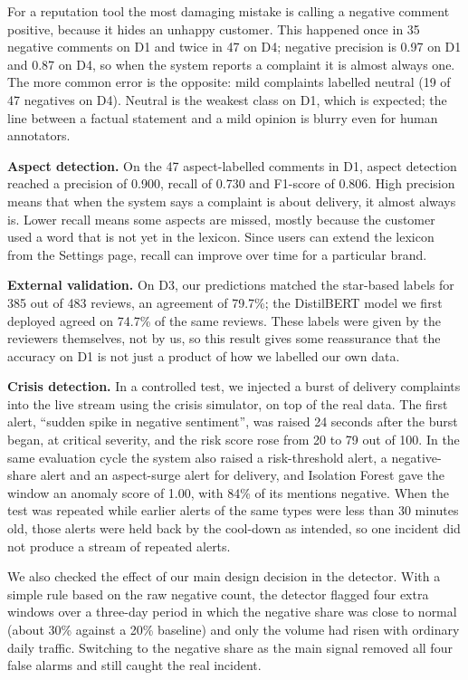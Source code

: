 \documentclass[12pt,a4paper]{report}
\begin{document}
For a reputation tool the most damaging mistake is calling a negative comment positive, because it hides an unhappy customer. This happened once in 35 negative comments on D1 and twice in 47 on D4; negative precision is 0.97 on D1 and 0.87 on D4, so when the system reports a complaint it is almost always one. The more common error is the opposite: mild complaints labelled neutral (19 of 47 negatives on D4). Neutral is the weakest class on D1, which is expected; the line between a factual statement and a mild opinion is blurry even for human annotators.

\textbf{Aspect detection.} On the 47 aspect-labelled comments in D1, aspect detection reached a precision of 0.900, recall of 0.730 and F1-score of 0.806. High precision means that when the system says a complaint is about delivery, it almost always is. Lower recall means some aspects are missed, mostly because the customer used a word that is not yet in the lexicon. Since users can extend the lexicon from the Settings page, recall can improve over time for a particular brand.

\textbf{External validation.} On D3, our predictions matched the star-based labels for 385 out of 483 reviews, an agreement of 79.7\%; the DistilBERT model we first deployed agreed on 74.7\% of the same reviews. These labels were given by the reviewers themselves, not by us, so this result gives some reassurance that the accuracy on D1 is not just a product of how we labelled our own data.

\textbf{Crisis detection.} In a controlled test, we injected a burst of delivery complaints into the live stream using the crisis simulator, on top of the real data. The first alert, ``sudden spike in negative sentiment'', was raised 24 seconds after the burst began, at critical severity, and the risk score rose from 20 to 79 out of 100. In the same evaluation cycle the system also raised a risk-threshold alert, a negative-share alert and an aspect-surge alert for delivery, and Isolation Forest gave the window an anomaly score of 1.00, with 84\% of its mentions negative. When the test was repeated while earlier alerts of the same types were less than 30 minutes old, those alerts were held back by the cool-down as intended, so one incident did not produce a stream of repeated alerts.

We also checked the effect of our main design decision in the detector. With a simple rule based on the raw negative count, the detector flagged four extra windows over a three-day period in which the negative share was close to normal (about 30\% against a 20\% baseline) and only the volume had risen with ordinary daily traffic. Switching to the negative share as the main signal removed all four false alarms and still caught the real incident.
\end{document}
